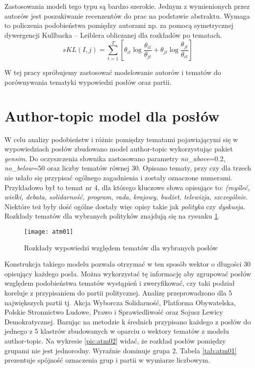 \documentclass[a4paper,11pt,twoside]{report}
\theoremstyle{definition}
\begin{document}
Zastosowania modeli tego typu są bardzo szerokie. Jednym z wymienionych przez autorów \cite{ATM} jest poszukiwanie recenzentów do prac na podstawie abstraktu. Wymaga to policzenia podobieństwa pomiędzy autorami np. za pomocą symetrycznej dywergencji Kullbacka – Leiblera obliczanej dla rozkładów po tematach.
\begin{equation}
sKL(I,j) = \sum_{t=1}^T \left[ \theta_{it} \log \frac{\theta_{it}}{\theta_{jt}} + \theta_{jt} \log \frac{\theta_{jt}}{\theta_{it}} \right]
\end{equation} 

W tej pracy spróbujemy zastosować modelowanie autorów i tematów do porównywania tematyki wypowiedzi posłów oraz partii.

\section{Author-topic model dla posłów}
W celu analizy podobieństw i różnic pomiędzy tematami pojawiającymi się w wypowiedziach posłów zbudowano model author-topic wykorzystując pakiet \textit{gensim}. Do oczyszczenia słownika zastosowano parametry \textit{no\_above}=0.2, \textit{no\_below}=50 oraz liczby tematów równej 30. Opisano tematy, przy czy dla trzech nie udało się przypisać ogólnego zagadnienia i zostały oznaczone numerami. Przykładowo był to temat nr 4, dla którego kluczowe słowa opisujące to: \textit{(myśleć, wielki, debata, solidarność, program, rada, krajowy, budżet, telewizja, szczególnie}. Niektóre też były dość ogólne dostały więc opisy takie jak \textit{polityka} czy \textit{dyskusja}. Rozkłady tematów dla wybranych polityków znajdują się na rysunku \ref{pic:atm01}.

\begin{figure}
\texttt{[image: atm01]} 
\centering \caption{Rozkłady wypowiedzi względem tematów dla wybranych posłów}
 \label{pic:atm01}
\end{figure}

Konstrukcja takiego modelu pozwala otrzymać w ten sposób wektor o długości 30 opisujący każdego posła. Można wykorzystać tę informację aby zgrupować posłów względem podobieństwa tematów wystąpień i zweryfikować, czy taki podział koreluje z przypisaniem do partii politycznej.
Analizę przeprowadzono dla 5 największych partii tj. Akcja Wyborcza Solidarność, Platforma Obywatelska, Polskie Stronnictwo Ludowe, Prawo i Sprawiedliwość oraz Sojusz Lewicy Demokratycznej. Bazując na metodzie k średnich przypisano każdego z posłów do jednego z 5 klastrów zbudowanych w oparciu o wektory tematów z modelu author-topic. Na wykresie \ref{pic:atm02} widać, że rozkład posłów pomiędzy grupami nie jest jednorodny. Wyraźnie dominuje grupa 2. Tabela \ref{tab:atm01} prezentuje spójność oznaczenia grup i partii w wymiarze liczbowym.
\end{document}
